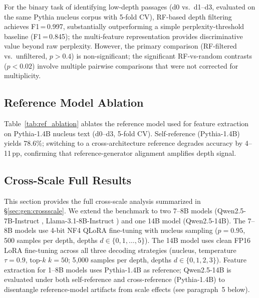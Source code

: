 For the binary task of identifying low-depth passages (d0 vs.\ d1--d3, evaluated on the same Pythia nucleus corpus with 5-fold CV), RF-based depth filtering achieves F1\,=\,0.997, substantially outperforming a simple perplexity-threshold baseline (F1\,=\,0.845); the multi-feature representation provides discriminative value beyond raw perplexity.
However, the primary comparison (RF-filtered vs.\ unfiltered, $p > 0.4$) is non-significant; the significant RF-vs-random contrasts ($p < 0.02$) involve multiple pairwise comparisons that were not corrected for multiplicity.

\subsection{Reference Model Ablation}
\label{app:ref_ablation}

Table~\ref{tab:ref_ablation} ablates the reference model used for feature extraction on Pythia-1.4B nucleus text (d0--d3, 5-fold CV).
Self-reference (Pythia-1.4B) yields 78.6\%; switching to a cross-architecture reference degrades accuracy by 4--11\,pp, confirming that reference-generator alignment amplifies depth signal.

\begin{table}[h]
\centering
\caption{Reference model ablation. Classification accuracy (5-fold CV) on Pythia-1.4B generated text (nucleus, d0--d3) using different reference models for feature extraction.}
\label{tab:ref_ablation}
\end{table}

\subsection{Cross-Scale Full Results}
\label{app:cross_scale_full}

This section provides the full cross-scale analysis summarized in \S\ref{sec:gen:crossscale}.
We extend the benchmark to two 7--8B models (Qwen2.5-7B-Instruct \cite{qwen2.5}, Llama-3.1-8B-Instruct \cite{llama3}) and one 14B model (Qwen2.5-14B).
The 7--8B models use 4-bit NF4 QLoRA fine-tuning with nucleus sampling ($p{=}0.95$, 500 samples per depth, depths $d \in \{0, 1, \ldots, 5\}$).
The 14B model uses clean FP16 LoRA fine-tuning across all three decoding strategies (nucleus, temperature $\tau{=}0.9$, top-$k$ $k{=}50$; 5{,}000 samples per depth, depths $d \in \{0, 1, 2, 3\}$).
Feature extraction for 1--8B models uses Pythia-1.4B as reference; Qwen2.5-14B is evaluated under both self-reference and cross-reference (Pythia-1.4B) to disentangle reference-model artifacts from scale effects (see paragraph~5 below).

